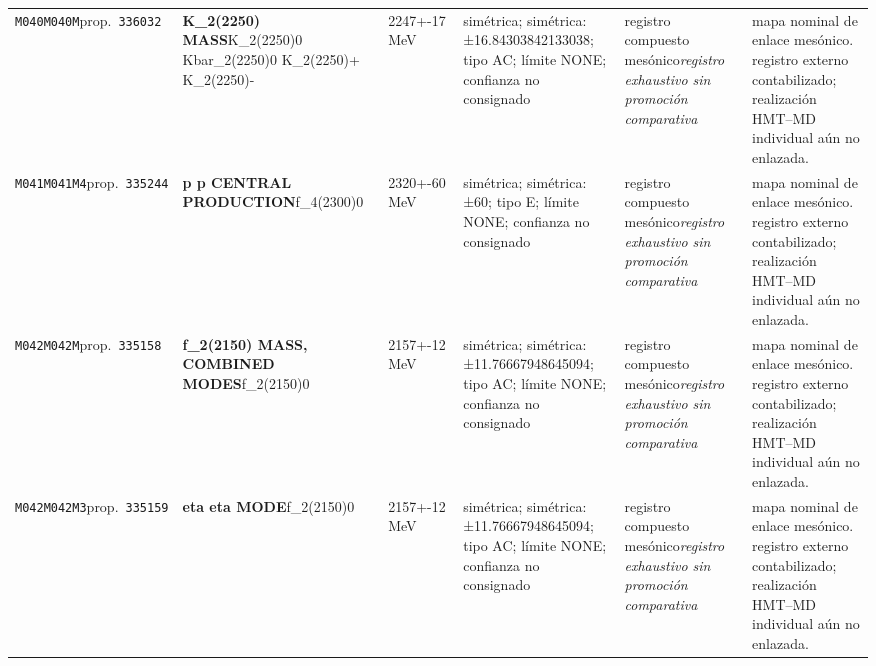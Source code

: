 \begin{landscape}
\begin{longtable}{L{1.85cm}L{4.45cm}L{2.35cm}L{4.05cm}L{3.35cm}L{7.15cm}}
\texttt{M040}\newline \texttt{M040M}\newline prop.\ \texttt{336032} & \textbf{K\_\allowbreak{}2(2250) MASS}\newline K\_\allowbreak{}2(2250)0 \textbar{}\allowbreak{} Kbar\_\allowbreak{}2(2250)0 \textbar{}\allowbreak{} K\_\allowbreak{}2(2250)+ \textbar{}\allowbreak{} K\_\allowbreak{}2(2250)- & 2247+-17\,MeV & simétrica; simétrica: ±16.84303842133038; tipo AC; límite NONE; confianza no consignado & registro compuesto mesónico\newline \emph{registro exhaustivo sin promoción comparativa} & mapa nominal de enlace mesónico. registro externo contabilizado; realización HMT--MD individual aún no enlazada. \\
\texttt{M041}\newline \texttt{M041M4}\newline prop.\ \texttt{335244} & \textbf{p p CENTRAL PRODUCTION}\newline f\_\allowbreak{}4(2300)0 & 2320+-60\,MeV & simétrica; simétrica: ±60; tipo E; límite NONE; confianza no consignado & registro compuesto mesónico\newline \emph{registro exhaustivo sin promoción comparativa} & mapa nominal de enlace mesónico. registro externo contabilizado; realización HMT--MD individual aún no enlazada. \\
\texttt{M042}\newline \texttt{M042M}\newline prop.\ \texttt{335158} & \textbf{f\_\allowbreak{}2(2150) MASS, COMBINED MODES}\newline f\_\allowbreak{}2(2150)0 & 2157+-12\,MeV & simétrica; simétrica: ±11.76667948645094; tipo AC; límite NONE; confianza no consignado & registro compuesto mesónico\newline \emph{registro exhaustivo sin promoción comparativa} & mapa nominal de enlace mesónico. registro externo contabilizado; realización HMT--MD individual aún no enlazada. \\
\texttt{M042}\newline \texttt{M042M3}\newline prop.\ \texttt{335159} & \textbf{eta eta MODE}\newline f\_\allowbreak{}2(2150)0 & 2157+-12\,MeV & simétrica; simétrica: ±11.76667948645094; tipo AC; límite NONE; confianza no consignado & registro compuesto mesónico\newline \emph{registro exhaustivo sin promoción comparativa} & mapa nominal de enlace mesónico. registro externo contabilizado; realización HMT--MD individual aún no enlazada. \\

\end{longtable}
\end{landscape}
